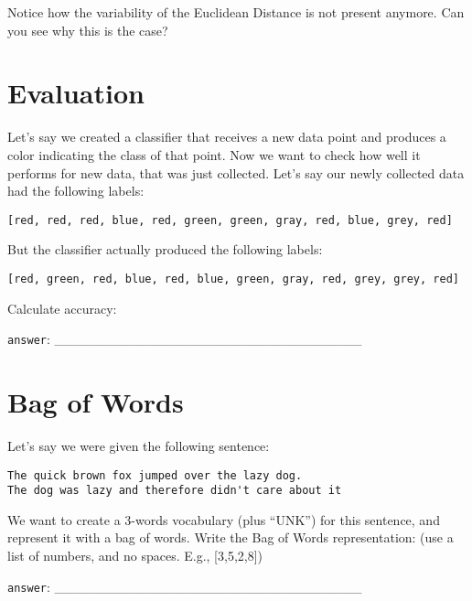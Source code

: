 \documentclass[a4paper,11pt]{scrartcl}
\begin{document}
Notice how the variability of the Euclidean Distance is not present
anymore. Can you see why this is the case?


\section{Evaluation}

Let's say we created a classifier that receives a new data point and produces
a color indicating the class of that point. Now we want to check how well it
performs for new data, that was just collected. Let's say our newly collected
data had the following labels:

\begin{verbatim}
[red, red, red, blue, red, green, green, gray, red, blue, grey, red]
\end{verbatim}

But the classifier actually produced the following labels:

\begin{verbatim}
[red, green, red, blue, red, blue, green, gray, red, grey, grey, red]
\end{verbatim}

Calculate accuracy:

\verb|answer|: \_\_\_\_\_\_\_\_\_\_\_\_\_\_\_\_\_\_\_\_\_\_\_\_\_\_\_\_\_\_\_\_


\section{Bag of Words}

Let's say we were given the following sentence:

\begin{verbatim}
The quick brown fox jumped over the lazy dog.
The dog was lazy and therefore didn't care about it
\end{verbatim}

We want to create a 3-words vocabulary (plus ``UNK'') for this sentence,
and represent it with a bag of words.
Write the Bag of Words representation:
(use a list of numbers, and no spaces. E.g., [3,5,2,8])

\verb|answer|: \_\_\_\_\_\_\_\_\_\_\_\_\_\_\_\_\_\_\_\_\_\_\_\_\_\_\_\_\_\_\_\_
\end{document}
